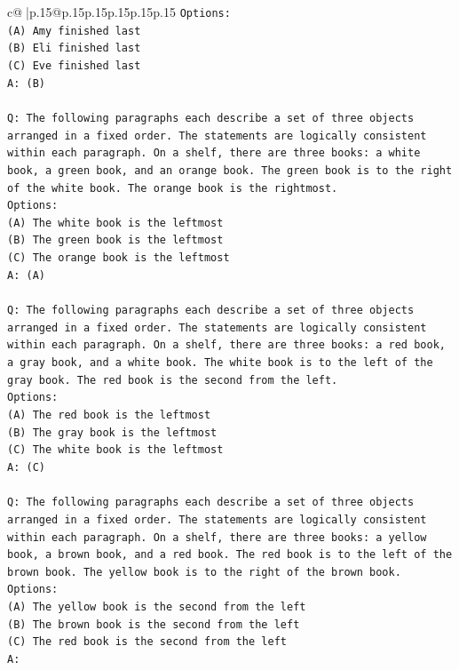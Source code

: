 \documentclass{article}
\begin{document}
{\begin{supertabular}{c@{$\;$}|p{.15\linewidth}@{}p{.15\linewidth}p{.15\linewidth}p{.15\linewidth}p{.15\linewidth}p{.15\linewidth}}
{{{\texttt{Options:} \\
\texttt{(A) Amy finished last} \\
\texttt{(B) Eli finished last} \\
\texttt{(C) Eve finished last} \\
\texttt{A: (B)} \\
\\ 
\texttt{Q: The following paragraphs each describe a set of three objects arranged in a fixed order. The statements are logically consistent within each paragraph. On a shelf, there are three books: a white book, a green book, and an orange book. The green book is to the right of the white book. The orange book is the rightmost.} \\
\texttt{Options:} \\
\texttt{(A) The white book is the leftmost} \\
\texttt{(B) The green book is the leftmost} \\
\texttt{(C) The orange book is the leftmost} \\
\texttt{A: (A)} \\
\\ 
\texttt{Q: The following paragraphs each describe a set of three objects arranged in a fixed order. The statements are logically consistent within each paragraph. On a shelf, there are three books: a red book, a gray book, and a white book. The white book is to the left of the gray book. The red book is the second from the left.} \\
\texttt{Options:} \\
\texttt{(A) The red book is the leftmost} \\
\texttt{(B) The gray book is the leftmost} \\
\texttt{(C) The white book is the leftmost} \\
\texttt{A: (C)} \\
\\ 
\texttt{Q: The following paragraphs each describe a set of three objects arranged in a fixed order. The statements are logically consistent within each paragraph. On a shelf, there are three books: a yellow book, a brown book, and a red book. The red book is to the left of the brown book. The yellow book is to the right of the brown book.} \\
\texttt{Options:} \\
\texttt{(A) The yellow book is the second from the left} \\
\texttt{(B) The brown book is the second from the left} \\
\texttt{(C) The red book is the second from the left} \\
\texttt{A:} \\
            }
        }
    }
     \\ \\


\end{supertabular}}
\end{document}
